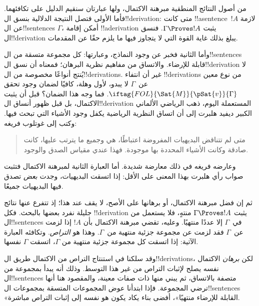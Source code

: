 \documentclass[../../../include/open-logic-section]{subfiles}
\begin{document}
      {}
      {}


من أصول النتائج المنطقية مبرهنة الاكتمال، ولها عبارتان سنقيم الدليل
على تكافئهما. فأما الأولى فتصل النتيجة الدلالية بنسق ال!!{derivation}:
متى كانت !!a{sentence}~$!A$ لازمة عن ال!!{sentence}s $\Gamma$، أمكن
إقامة !!a{derivation} يثبت $\Gamma \Proves !A$. فنسق ال!!{derivation}
يبلغ بذلك غاية القوة التي لا يتجاوز فيها ما يلزم حقًا عن المقدمات.

وأما الثانية فخبر عن وجود النماذج، وعبارتها: كل مجموعة متسقة من
ال!!{sentence}s قابلة للإرضاء. والاتساق من مفاهيم نظرية البرهان؛ فمعناه
أن نسق ال!!{derivation} لا يُنتج أنواعًا مخصوصة من ال!!{derivation}s.
غير أن انتفاء !!{derivation}s من نوع معين عن~$\Gamma$ لا يبدو، لأول
وهلة، كافيًا لضمان وجود
تحقق $\iftag{FOL}{\Sat{M}}{\pSat{v}}{\Gamma}$. فما وجه هذا الضمان؟
قبل أن يثبت الاكتمال، بل قبل ظهور أنساق ال!!{derivation} المستعملة
اليوم، ذهب الرياضي الألماني الكبير ديفيد هلبرت إلى أن اتساق النظرية
الرياضية يكفل وجود الأشياء التي تبحث فيها. وكتب إلى غوتلوب فريغه:
\begin{quote}
  متى لم تتناقض البديهيات المفروضة اعتباطًا، هي وجميع ما يترتب عليها،
  كانت صادقة وكانت الأشياء المحددة بها موجودة. فهذا عندي مقياس الصدق
  والوجود.
\end{quote}
وعارضه فريغه في ذلك معارضة شديدة. أما العبارة الثانية لمبرهنة
الاكتمال فتثبت صواب رأي هلبرت بهذا المعنى على الأقل: إذا اتسقت
البديهيات، وجدت \emph{بعض}
 تصدق فيها البديهيات جميعًا.

ثم إن فضل مبرهنة الاكتمال، أو برهانها على الأصح، لا يقف عند هذا؛ إذ
تتفرع عنها نتائج جليلة نفرد بعضها بالبحث. فكل
!!{derivation} يثبت $\Gamma \Proves !A$ منتهٍ، فلا يستعمل من
ال!!{sentence}s في~$\Gamma$ إلا عددًا منتهيًا. وعليه، تقضي مبرهنة
الاكتمال بأن $!A$ إذا لزمت عن~$\Gamma$ فقد لزمت عن مجموعة جزئية
منتهية من~$\Gamma$. وهذا هو \emph{التراص}. وتكافئه العبارة الآتية:
إذا اتسقت كل مجموعة جزئية منتهية من $\Gamma$، اتسقت $\Gamma$ نفسها.

وقد سلكنا في استنتاج التراص من الاكتمال طريق ال!!{derivation}s، لكن
\emph{برهان} الاكتمال نفسه يصلح لإثبات التراص من غير هذا التوسط.
وذلك أنه يبدأ بمجموعة من ال!!{sentence}s متصفة بالاتساق، ثم يبني
منها  ذات صفات معينة،
والمقصود هنا أنها ترضي المجموعة. فإذا ابتدأنا عوض المجموعات المتسقة
بمجموعات ال!!{sentence}s «القابلة للإرضاء منتهيًا»، أفضى بناء يكاد
يكون هو نفسه إلى إثبات التراص مباشرة.
\end{document}
